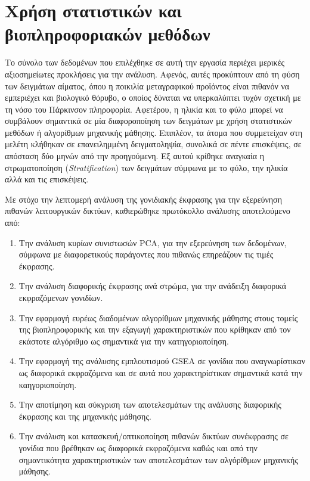 \documentclass[12pt]{report}
\begin{document}
    \section{Χρήση στατιστικών και βιοπληροφοριακών μεθόδων}
        \par
            Το σύνολο των δεδομένων που επιλέχθηκε σε αυτή την εργασία περιέχει μερικές αξιοσημείωτες προκλήσεις για την ανάλυση. Αφενός, αυτές προκύπτουν από τη φύση των δειγμάτων αίματος, όπου η ποικιλία μεταγραφικού προϊόντος είναι πιθανόν να εμπεριέχει και βιολογικό θόρυβο, ο οποίος δύναται να υπερκαλύπτει τυχόν σχετική με τη νόσο του Πάρκινσον πληροφορία. Αφετέρου, η ηλικία και το φύλο μπορεί να συμβάλουν σημαντικά σε μία διαφοροποίηση των δειγμάτων με χρήση στατιστικών μεθόδων ή αλγορίθμων μηχανικής μάθησης. Επιπλέον, τα άτομα που συμμετείχαν στη μελέτη κλήθηκαν σε επανειλημμένη δειγματοληψία, συνολικά σε πέντε επισκέψεις, σε απόσταση δύο μηνών από την προηγούμενη. Εξ αυτού κρίθηκε αναγκαία η στρωματοποίηση (\emph{Stratification}) των δειγμάτων σύμφωνα με το φύλο, την ηλικία αλλά και τις επισκέψεις.
        \par
            Με στόχο την λεπτομερή ανάλυση της γονιδιακής έκφρασης για την εξερεύνηση πιθανών λειτουργικών δικτύων, καθιερώθηκε πρωτόκολλο ανάλυσης αποτελούμενο από:
            \begin{enumerate}
                \item Την ανάλυση κυρίων συνιστωσών PCA, για την εξερεύνηση των δεδομένων, σύμφωνα με διαφορετικούς παράγοντες που πιθανώς επηρεάζουν τις τιμές έκφρασης.
                \item Την ανάλυση διαφορικής έκφρασης ανά στρώμα, για την ανάδειξη διαφορικά εκφραζόμενων γονιδίων.
                \item Την εφαρμογή ευρέως διαδομένων αλγορίθμων μηχανικής μάθησης στους τομείς της βιοπληροφορικής και την εξαγωγή χαρακτηριστικών που κρίθηκαν από τον εκάστοτε αλγόριθμο ως σημαντικά για την κατηγοριοποίηση.
                \item Την εφαρμογή της ανάλυσης εμπλουτισμού GSEA σε γονίδια που αναγνωρίστικαν ως διαφορικά εκφραζόμενα και σε αυτά που χαρακτηρίστικαν σημαντικά κατά την καηγοριοποίηση.
                \item Την αποτίμηση και σύκγριση των αποτελεσμάτων της ανάλυσης διαφορικής έκφρασης και της μηχανικής μάθησης.
                \item Την ανάλυση και κατασκευή/οπτικοποίηση πιθανών δικτύων συνέκφρασης σε γονίδια που βρέθηκαν ως διαφορικά εκφραζόμενα καθώς και από την σημαντικότητα χαρακτηριστικών των αποτελεσμάτων των αλγόρίθμων μηχανικής μάθησης.
            \end{enumerate}
\end{document}
